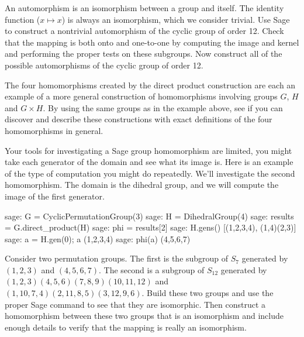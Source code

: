 \begin{sageverbatim}\end{sageverbatim}
%
%
An automorphism is an isomorphism between a group and itself.  The identity function ($x\mapsto x$) is always an isomorphism, which we consider trivial.  Use Sage to construct a nontrivial automorphism of the cyclic group of order 12.  Check that the mapping is both onto and one-to-one by computing the image and kernel and performing the proper tests on these subgroups.  Now construct all of the possible automorphisms of the cyclic group of order 12.
\begin{sageverbatim}\end{sageverbatim}
%
%
The four homomorphisms created by the direct product construction are each an example of a more general construction of homomorphisms involving groups $G$, $H$ and $G\times H$.  By using the same groups as in the example above, see if you can discover and describe these constructions with exact definitions of the four homomorphisms in general.\par
%
Your tools for investigating a Sage group homomorphism are limited, you might take each generator of the domain and see what its image is.  Here is an example of the type of computation you might do repeatedly.  We'll investigate the second homomorphism.  The domain is the dihedral group, and we will compute the image of the first generator.
%
\begin{sageexample}
sage: G = CyclicPermutationGroup(3)
sage: H = DihedralGroup(4)
sage: results = G.direct_product(H)
sage: phi = results[2]
sage: H.gens()
[(1,2,3,4), (1,4)(2,3)]
sage: a = H.gen(0); a
(1,2,3,4)
sage: phi(a)
(4,5,6,7)
\end{sageexample}
%
\begin{sageverbatim}\end{sageverbatim}
%
%
Consider two permutation groups.  The first is the subgroup of $S_7$ generated by $(1, 2, 3)$ and $(4, 5, 6, 7)$.  The second is a subgroup of $S_{12}$ generated by $(1, 2, 3)(4, 5, 6)(7, 8, 9)(10, 11, 12)$ and $(1, 10, 7, 4)(2, 11, 8, 5)(3, 12, 9, 6)$.  Build these two groups and use the proper Sage command to see that they are isomorphic.  Then construct a homomorphism between these two groups that is an isomorphism and include enough details to verify that the mapping is really an isomorphism.
